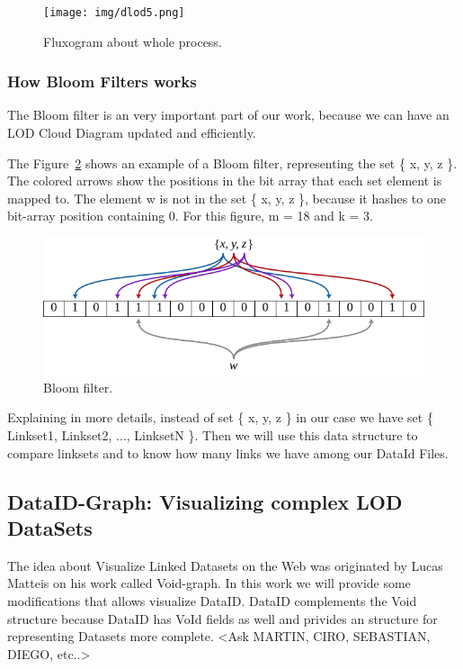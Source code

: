 \documentclass{iosart2c}
\begin{document}
\begin{figure}
  \centering
  \texttt{[image: img/dlod5.png]}
  \caption{Fluxogram about whole process.}
  \label{fig:idea2}
\end{figure}

\subsubsection{How Bloom Filters works}
The Bloom filter is an very important part of our work, because we can have an LOD Cloud Diagram updated and efficiently.

The Figure~\ref{fig:bloomfilter} shows an example of a Bloom filter, representing the set \{ x, y, z \}. The colored arrows show the positions in the bit array that each set element is mapped to. The element w is not in the set \{ x, y, z \}, because it hashes to one bit-array position containing 0. For this figure, m = 18 and k = 3.
\begin{figure}
  \centering
  \includegraphics[width=\linewidth]{img/bloomfilter.png}
  \caption{Bloom filter.}
  \label{fig:bloomfilter}
\end{figure}

Explaining in more details, instead of set \{ x, y, z \} in our case we have set \{ Linkset1, Linkset2, ..., LinksetN \}. Then we will use this data structure to compare linksets and to know how many links we have among our DataId Files.

\subsection{DataID-Graph: Visualizing complex LOD DataSets}

The idea about Visualize Linked Datasets on the Web was originated by Lucas Matteis on his work called Void-graph. In this work we will provide some modifications that allows visualize DataID.
DataID complements the Void structure because DataID has VoId fields as well and privides an structure for representing Datasets more complete. <Ask MARTIN, CIRO, SEBASTIAN, DIEGO, etc..>
\end{document}
